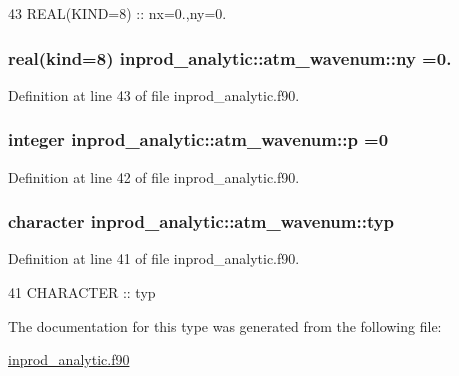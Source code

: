 \begin{DoxyCode}
43      \textcolor{keywordtype}{REAL(KIND=8)} :: nx=0.,ny=0.
\end{DoxyCode}
\subsubsection[{\texorpdfstring{ny}{ny}}]{\setlength{\rightskip}{0pt plus 5cm}real(kind=8) inprod\+\_\+analytic\+::atm\+\_\+wavenum\+::ny =0.\hspace{0.3cm}{\ttfamily [private]}}\hypertarget{structinprod__analytic_1_1atm__wavenum_af75974631175c67689c588f6d92ceb3e}{}\label{structinprod__analytic_1_1atm__wavenum_af75974631175c67689c588f6d92ceb3e}


Definition at line 43 of file inprod\+\_\+analytic.\+f90.

\subsubsection[{\texorpdfstring{p}{p}}]{\setlength{\rightskip}{0pt plus 5cm}integer inprod\+\_\+analytic\+::atm\+\_\+wavenum\+::p =0\hspace{0.3cm}{\ttfamily [private]}}\hypertarget{structinprod__analytic_1_1atm__wavenum_a5a938641d8939931bc4eb71499298a6a}{}\label{structinprod__analytic_1_1atm__wavenum_a5a938641d8939931bc4eb71499298a6a}


Definition at line 42 of file inprod\+\_\+analytic.\+f90.

\subsubsection[{\texorpdfstring{typ}{typ}}]{\setlength{\rightskip}{0pt plus 5cm}character inprod\+\_\+analytic\+::atm\+\_\+wavenum\+::typ\hspace{0.3cm}{\ttfamily [private]}}\hypertarget{structinprod__analytic_1_1atm__wavenum_a1c12be211e96c5a773aae4c2146a3792}{}\label{structinprod__analytic_1_1atm__wavenum_a1c12be211e96c5a773aae4c2146a3792}


Definition at line 41 of file inprod\+\_\+analytic.\+f90.


\begin{DoxyCode}
41      \textcolor{keywordtype}{CHARACTER} :: typ
\end{DoxyCode}


The documentation for this type was generated from the following file\+:\begin{DoxyCompactItemize}
\item 
\hyperlink{inprod__analytic_8f90}{inprod\+\_\+analytic.\+f90}\end{DoxyCompactItemize}
